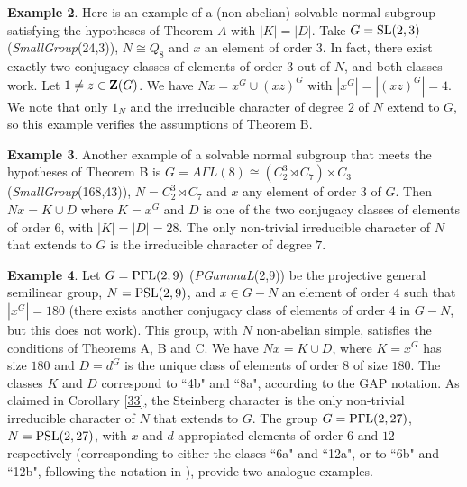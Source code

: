 \documentclass[12pt,leqno,a4paper]{amsart}
\numberwithin{equation}{section}
\begin{document}
\medskip
\noindent
 {\bf Example 2}. Here is an example of a (non-abelian) solvable normal subgroup satisfying the hypotheses of Theorem $A$ with $|K|=|D|$. Take $G={\rm SL}(2,3)$ ({\it SmallGroup}(24,3)), $N\cong Q_8$ and $x$ an element of order $3$. In fact, there exist exactly  two conjugacy classes of elements of order $3$ out of $N$, and both classes work. Let $1\neq z\in {\bf Z}(G)$. We have $Nx=x^G \cup (xz)^G$ with $|x^G|=|(xz)^G|= 4$. We  note that only $1_N$ and the irreducible character of degree $2$ of $N$ extend to $G$, so this example verifies the assumptions of Theorem B.


\medskip
\noindent
{\bf Example 3}. Another example of a solvable normal subgroup that meets the hypotheses of Theorem B is $G=A\Gamma L(8)\cong (C_2^3 \rtimes C_7)\rtimes C_3$ ({\it SmallGroup}(168,43)), $N=C_2^3\rtimes C_7$ and $x$ any element of order $3$ of $G$. Then $Nx=K\cup D$ where $K=x^G$ and $D$ is one of the two conjugacy classes of elements of order $6$, with $|K|=|D|=28$. The only non-trivial irreducible character of $N$ that extends to $G$ is the irreducible character of degree $7$.

\medskip
\noindent
{\bf Example 4}.
Let $G={\rm P\Gamma L}(2,9)$ ({\it PGammaL}(2,9)) be the projective general semilinear group,  $N= {\rm PSL}(2,9)$, and $x\in G- N$ an element of order $4$ such that $|x^G|=180$ (there exists another conjugacy class of elements of order 4 in $G-N$, but this does not work). This group, with $N$ non-abelian simple,  satisfies the conditions of Theorems A, B and C.  We have $Nx=K \cup D$, where $K=x^G$ has size $180$ and $D=d^G$ is the unique class of elements of order $8$ of size $180$.  The classes $K$ and $D$ correspond to ``4b" and ``8a", according to the GAP notation. As claimed in Corollary \ref{33}, the Steinberg character is the only non-trivial irreducible character of $N$ that extends to $G$. The group $G={\rm P\Gamma L}(2,27)$, $N= {\rm PSL}(2,27)$, with $x$ and $d$ appropiated elements of order $6$ and $12$  respectively (corresponding to either  the clases ``6a" and ``12a", or to ``6b" and ``12b", following the notation in \cite{GAP}), provide two analogue examples.



\end{document}
